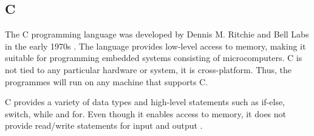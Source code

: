 \subsection{C}
The C programming language was developed by Dennis M. Ritchie and Bell Labs in the early 1970s \cite{clanguage}. The language provides low-level access to memory, making it suitable for programming embedded systems consisting of microcomputers. C is not tied to any particular hardware or system, it is cross-platform. Thus, the programmes will run on any machine that supports C.

C provides a variety of data types and high-level statements such as if-else, switch, while and for. Even though it enables access to memory, it does not provide read/write statements for input and output \cite{cproglang}. 

